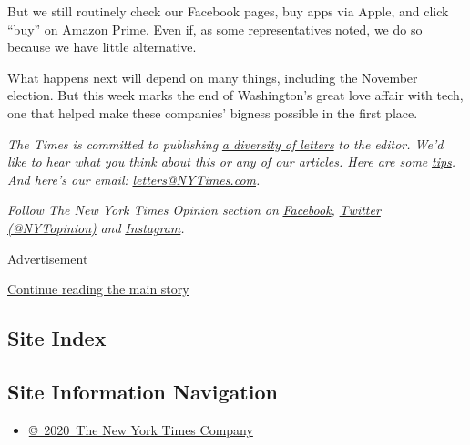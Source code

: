 But we still routinely check our Facebook pages, buy apps via Apple, and
click ``buy'' on Amazon Prime. Even if, as some representatives noted,
we do so because we have little alternative.

What happens next will depend on many things, including the November
election. But this week marks the end of Washington's great love affair
with tech, one that helped make these companies' bigness possible in the
first place.

\emph{The Times is committed to publishing}
\href{https://www.nytimes3xbfgragh.onion/2019/01/31/opinion/letters/letters-to-editor-new-york-times-women.html}{\emph{a
diversity of letters}} \emph{to the editor. We'd like to hear what you
think about this or any of our articles. Here are some}
\href{https://help.nytimes3xbfgragh.onion/hc/en-us/articles/115014925288-How-to-submit-a-letter-to-the-editor}{\emph{tips}}\emph{.
And here's our email:}
\href{mailto:letters@NYTimes.com}{\emph{letters@NYTimes.com}}\emph{.}

\emph{Follow The New York Times Opinion section on}
\href{https://www.facebookcorewwwi.onion/nytopinion}{\emph{Facebook}}\emph{,}
\href{http://twitter.com/NYTOpinion}{\emph{Twitter (@NYTopinion)}}
\emph{and}
\href{https://www.instagram.com/nytopinion/}{\emph{Instagram}}\emph{.}

Advertisement

\protect\hyperlink{after-bottom}{Continue reading the main story}

\hypertarget{site-index}{%
\subsection{Site Index}\label{site-index}}

\hypertarget{site-information-navigation}{%
\subsection{Site Information
Navigation}\label{site-information-navigation}}

\begin{itemize}
\tightlist
\item
  \href{https://help.nytimes3xbfgragh.onion/hc/en-us/articles/115014792127-Copyright-notice}{©~2020~The
  New York Times Company}
\end{itemize}

